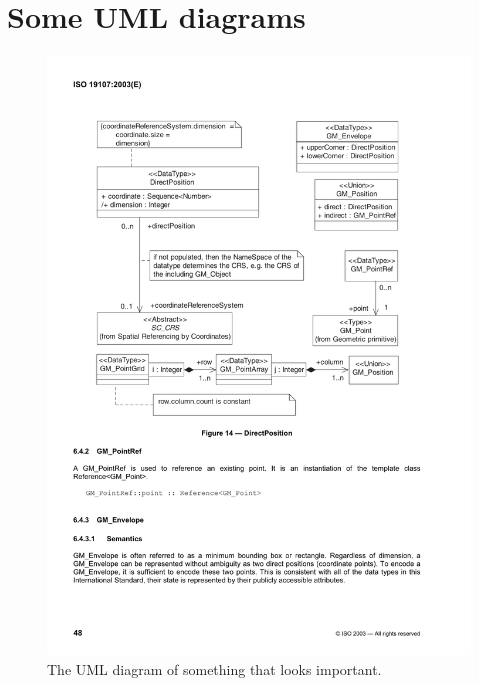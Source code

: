 

\chapter{Some UML diagrams}

\begin{figure}
  \centering
  \includegraphics[width=0.8\linewidth]{figs/someuml.pdf}
  \caption{The UML diagram of something that looks important.}
\label{fig:someuml}
\end{figure}